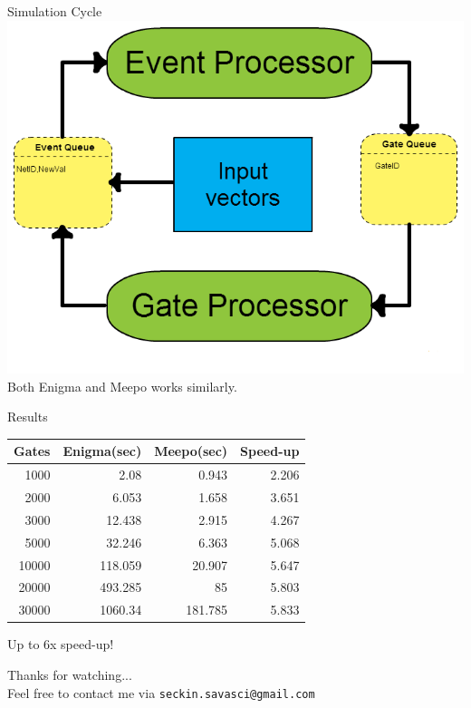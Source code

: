 \documentclass[aspectratio=1610]{beamer}
\begin{document}
\begin{frame}{Simulation Cycle}
\centering \includegraphics[height=0.75\textheight]{diagram.png} \\
\centering Both Enigma and Meepo works similarly.
\end{frame}

\begin{frame}{Results}
\centering \begin{tabular}{| r | r | r | r |}

\hline                        
Gates & Enigma(sec) & Meepo(sec) & Speed-up \\ \hline 
1000 & 2.08 & 0.943 & 2.206 \\ \hline
2000 & 6.053 & 1.658  & 3.651 \\ \hline
3000 & 12.438 & 2.915 & 4.267 \\ \hline
5000 & 32.246 & 6.363  & 5.068 \\ \hline
10000 & 118.059 & 20.907 & 5.647 \\ \hline
20000 & 493.285 & 85  & 5.803 \\ \hline
30000 & 1060.34 & 181.785  & 5.833 \\ \hline
\end{tabular} 
\huge Up to 6x speed-up!
\end{frame}

\begin{frame}
\LARGE Thanks for watching... \\
Feel free to contact me via \texttt{seckin.savasci@gmail.com}
\end{frame}
\end{document}
